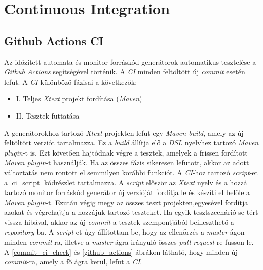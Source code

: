 \clearpage\section{Continuous Integration}\subsection{Github Actions CI}

Az időzített automata és monitor forráskód generátorok automatikus tesztelése a \textit{Github Actions} segítségével történik.
A \textit{CI} minden feltöltött új \textit{commit} esetén lefut.
A \textit{CI} különböző fázisai a következők:

\begin{itemize}
    \item I. Teljes \textit{Xtext} projekt fordítása (\textit{Maven})
    \item II. Tesztek futtatása
\end{itemize}

A generátorokhoz tartozó \textit{Xtext} projekten lefut egy \textit{Maven build}, amely az új feltöltött verziót tartalmazza.
Ez a \textit{build} állítja elő a \textit{DSL} nyelvhez tartozó \textit{Maven plugin}-t is.
Ezt követően hajtódnak végre a tesztek, amelyek a frissen fordított \textit{Maven plugin}-t használják.
Ha az összes fázis sikeresen lefutott, akkor az adott változtatás nem rontott el semmilyen korábbi funkciót.
A \textit{CI}-hoz tartozó \textit{script}-et a \ref{ci_script} kódrészlet tartalmazza.
A \textit{script} először az \textit{Xtext} nyelv és a hozzá tartozó monitor forráskód generátor új verzióját fordítja le és készíti el belőle a \textit{Maven plugin}-t.
Ezután végig megy az összes teszt projekten,egyesével fordítja azokat és végrehajtja a hozzájuk tartozó teszteket.
Ha egyik tesztszcenárió se tért vissza hibával, akkor az új \textit{commit} a tesztek szempontjából beilleszthető a \textit{repository}-ba.
A \textit{script}-et úgy állítottam be, hogy az ellenőrzés a \textit{master} ágon minden \textit{commit}-ra, illetve a \textit{master} ágra irányuló összes \textit{pull request}-re fusson le.
A \ref{commit_ci_check} és \ref{github_actions} ábrákon látható, hogy minden új \textit{commit}-ra, amely a fő ágra kerül, lefut a \textit{CI}.

